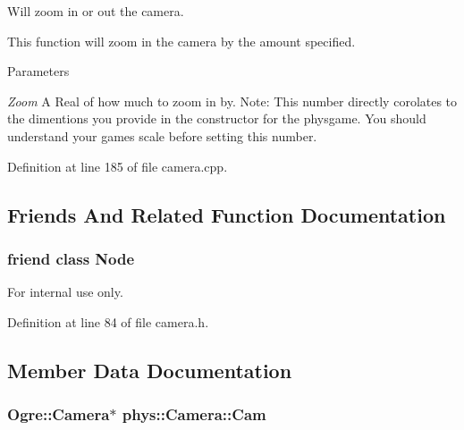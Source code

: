 Will zoom in or out the camera. 

This function will zoom in the camera by the amount specified. 
\begin{DoxyParams}{Parameters}
\item[{\em Zoom}]A Real of how much to zoom in by. Note: This number directly corolates to the dimentions you provide in the constructor for the physgame. You should understand your games scale before setting this number. \end{DoxyParams}


Definition at line 185 of file camera.cpp.



\subsection{Friends And Related Function Documentation}
\hypertarget{classphys_1_1Camera_a6db9d28bd448a131448276ee03de1e6d}{
\subsubsection[{Node}]{\setlength{\rightskip}{0pt plus 5cm}friend class {\bf Node}}}
\label{d9/df8/classphys_1_1Camera_a6db9d28bd448a131448276ee03de1e6d}
\begin{DoxyInternal}{For internal use only.}
\end{DoxyInternal}


Definition at line 84 of file camera.h.



\subsection{Member Data Documentation}
\hypertarget{classphys_1_1Camera_a91622148b9b9a9ae1554c828f7e2fc89}{
\subsubsection[{Cam}]{\setlength{\rightskip}{0pt plus 5cm}Ogre::Camera$\ast$ {\bf phys::Camera::Cam}}}
\label{d9/df8/classphys_1_1Camera_a91622148b9b9a9ae1554c828f7e2fc89}


